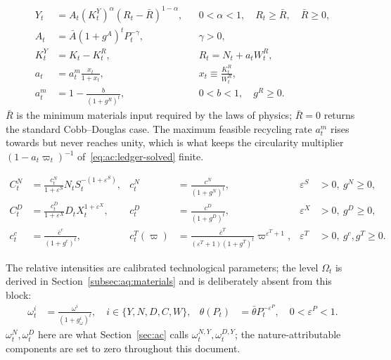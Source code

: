 \begin{align}
Y_t &= A_t\left(K^Y_t\right)^{\alpha}\left(R_t-\bar R\right)^{1-\alpha},
&&
0<\alpha<1,\quad R_t\ge\bar R,\quad \bar R\ge 0,
\label{eq:aq:production}
\\
A_t &= \bar A\left(1+g^A\right)^tP_t^{-\gamma},
&&
\gamma>0,
\label{eq:aq:productivity}
\\
K^Y_t &= K_t-K^R_t,
&&
R_t = N_t+a_tW^R_t,
\label{eq:aq:definitions}
\\
a_t &= a^m_t\frac{x_t}{1+x_t},
&&
x_t\equiv\frac{K^R_t}{W^R_t},
\label{eq:aq:recycling-rate}
\\
a^m_t &= 1-\frac{b}{\left(1+g^R\right)^t},
&&
0<b<1,\quad g^R\ge 0.
\label{eq:aq:recycling-frontier}
\end{align}
$\bar R$ is the minimum materials input required by the laws of physics; $\bar R=0$ returns the standard Cobb--Douglas case. The maximum feasible recycling rate $a^m_t$ rises towards but never reaches unity, which is what keeps the circularity multiplier $\left(1-a_t\varpi_t\right)^{-1}$ of~\eqref{eq:ac:ledger-solved} finite.

\begin{align}
C^N_t &= \frac{c^N_t}{1+\varepsilon^S}N_tS_t^{-\left(1+\varepsilon^S\right)},
&
c^N_t &= \frac{c^N}{\left(1+g^N\right)^t},
&
\varepsilon^S&>0,\ g^N\ge 0,
\label{eq:aq:extraction-cost}
\\
C^D_t &= \frac{c^D_t}{1+\varepsilon^X}D_tX_t^{1+\varepsilon^X},
&
c^D_t &= \frac{c^D}{\left(1+g^D\right)^t},
&
\varepsilon^X&>0,\ g^D\ge 0,
\label{eq:aq:discovery-cost}
\\
c^c_t &= \frac{\bar c^c}{\left(1+g^c\right)^t},
&
c^T_t(\varpi) &= \frac{\bar c^T}{\left(\varepsilon^T+1\right)\left(1+g^T\right)^t}\varpi^{\varepsilon^T+1},
&
\varepsilon^T&>0,\ g^c,g^T\ge 0.
\label{eq:aq:waste-cost}
\end{align}

 The relative intensities are calibrated technological parameters; the level $\Omega_t$ is derived in Section~\ref{subsec:aq:materials} and is deliberately absent from this block:
\begin{align}
\omega^i_t &= \frac{\omega^i}{\left(1+g^i_\omega\right)^t},\quad i\in\{Y,N,D,C,W\},
&
\theta(P_t) &= \bar\theta P_t^{-\varepsilon^P},
\quad 0<\varepsilon^P<1.
\label{eq:aq:intensities}
\end{align}
$\omega^N_t,\omega^D_t$ here are what Section~\ref{sec:ac} calls $\omega^{N,Y}_t,\omega^{D,Y}_t$; the nature-attributable components are set to zero throughout this document.

